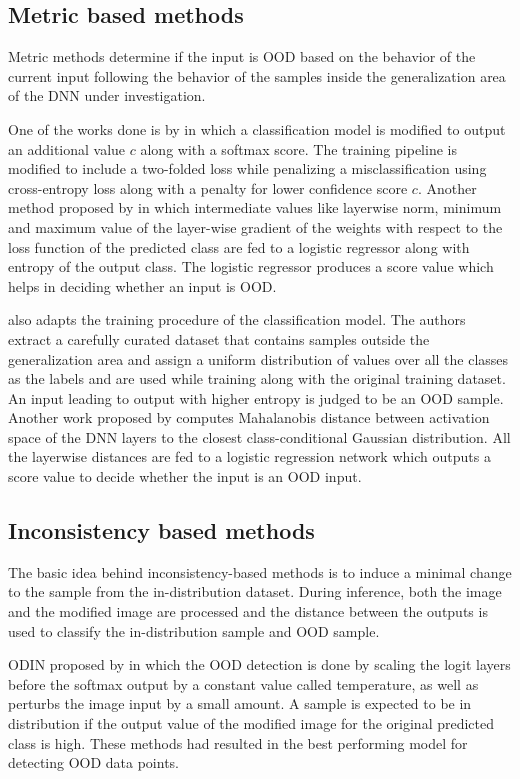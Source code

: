     \subsection{Metric based methods}
    Metric methods determine if the input is OOD based on the behavior of the current input following the behavior of the samples inside the generalization area of the DNN under investigation. 
    
    One of the works done is by \citet{Devries} in which a classification model is modified to output an additional value $c$ along with a softmax score. The training pipeline is modified to include a two-folded loss while penalizing a misclassification using cross-entropy loss along with a penalty for lower confidence score $c$. Another method proposed by \citet{Oberdiek2018} in which intermediate values like layerwise norm, minimum and maximum value of the layer-wise gradient of the weights with respect to the loss function of the predicted class are fed to a logistic regressor along with entropy of the output class. The logistic regressor produces a score value which helps in deciding whether an input is OOD. 
    
    \citet{Hendrycks2018} also adapts the training procedure of the classification model. The authors extract a carefully curated dataset that contains samples outside the generalization area and assign a uniform distribution of values over all the classes as the labels and are used while training along with the original training dataset. An input leading to output with higher entropy is judged to be an OOD sample. Another work proposed by \citet{Lee2018} computes Mahalanobis distance between activation space of the DNN layers to the closest class-conditional Gaussian distribution. All the layerwise distances are fed to a logistic regression network which outputs a score value to decide whether the input is an OOD input.
    \subsection{Inconsistency based methods}
    The basic idea behind inconsistency-based methods is to induce a minimal change to the sample from the in-distribution dataset. During inference, both the image and the modified image are processed and the distance between the outputs is used to classify the in-distribution sample and OOD sample.
    
    ODIN proposed by \citet{liang2017enhancing} in which the OOD detection is done by scaling the logit layers before the softmax output by a constant value called temperature, as well as perturbs the image input by a small amount. A sample is expected to be in distribution if the output value of the modified image for the original predicted class is high. These methods had resulted in the best performing model for detecting OOD data points. 
